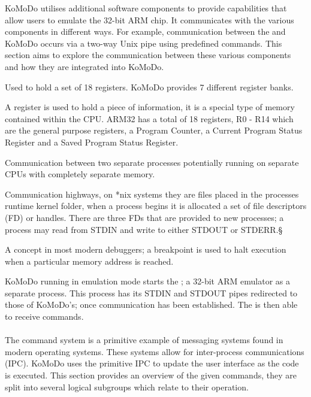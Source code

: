KoMoDo utilises additional software components to provide capabilities that allow users to emulate the 32-bit ARM chip. It communicates with the various components in different ways. For example, communication between the  and KoMoDo occurs via a two-way Unix pipe using predefined commands. This section aims to explore the communication between these various components and how they are integrated into KoMoDo.

  \begin{description}[leftmargin=!,labelwidth=\widthof{\bfseries \footnotesize inter process communication}]
    \item[\footnotesize Register bank] Used to hold a set of 18 registers. KoMoDo provides 7 different register banks.
    \item[\footnotesize Register] A register is used to hold a piece of information, it is a special type of memory contained within the CPU. ARM32 has a total of 18 registers, R0 - R14 which are the general purpose registers, a Program Counter, a Current Program Status Register and a Saved Program Status Register.
    \item[\footnotesize Inter process communication] Communication between two separate processes potentially running on separate CPUs with completely separate memory.
    \item[\footnotesize (*nix) pipes] Communication highways, on *nix systems they are files placed in the processes runtime kernel folder, when a process begins it is allocated a set of file descriptors (FD) or handles. There are three FDs that are provided to new processes; a process may read from STDIN and write to  either STDOUT or STDERR.§
    \item[\footnotesize breakpoint] A concept in most modern debuggers; a breakpoint is used to halt execution when a particular memory address is reached.
  \end{description}
%
KoMoDo running in emulation mode starts the ; a 32-bit ARM emulator as a separate process. This process has its STDIN and STDOUT pipes redirected to those of KoMoDo's; once communication has been established. The  is then able to receive commands.\\\\
%
The command system is a primitive example of messaging systems found in modern operating systems. These systems allow for inter-process communications (IPC). KoMoDo uses the primitive IPC to update the user interface as the code is executed. This section provides an overview of the given commands, they are split into several logical subgroups which relate to their operation.

